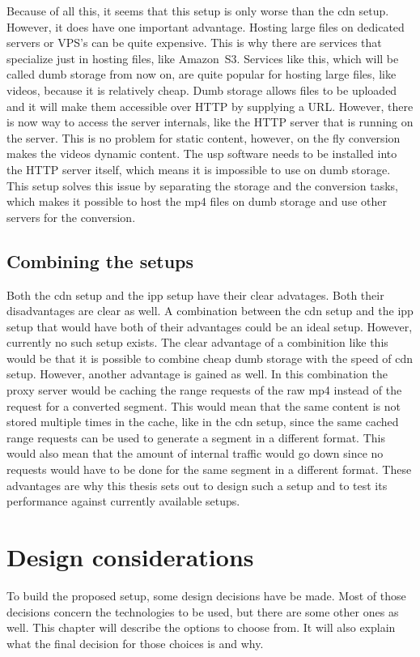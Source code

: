 \documentclass[twoside,openright]{uva-bachelor-thesis}
\begin{document}
Because of all this, it seems that this setup is only worse than the \gls{cdn}
setup. However, it does have one important advantage. Hosting large files on
dedicated servers or VPS’s can be quite expensive. This is why there are
services that specialize just in hosting files, like Amazon~S3. Services like
this, which will be called dumb storage from now on, are quite popular for
hosting large files, like videos, because it is relatively cheap. Dumb storage
allows files to be uploaded and it will make them accessible over HTTP by
supplying a URL\@.  However, there is now way to access the server internals,
like the HTTP server that is running on the server. This is no problem for
static content, however, on the fly conversion makes the videos dynamic content.
The \gls{usp} software needs to be installed into the HTTP server itself, which
means it is impossible to use on dumb storage. This setup solves this issue by
separating the storage and the conversion tasks, which makes it possible to host
the mp4 files on dumb storage and use other servers for the conversion.

\section{Combining the setups}
Both the \gls{cdn} setup and the \gls{ipp} setup have their clear advatages.
Both their disadvantages are clear as well. A combination between the \gls{cdn}
setup and the \gls{ipp} setup that would have both of their advantages could be
an ideal setup. However, currently no such setup exists. The clear advantage
of a combinition like this would be that it is possible to combine cheap dumb
storage with the speed of \gls{cdn} setup. However, another advantage is gained
as well. In this combination the proxy server would be caching the range
requests of the raw mp4 instead of the request for a converted segment. This
would mean that the same content is not stored multiple times in the cache, like
in the \gls{cdn} setup, since the same cached range requests can be used to
generate a segment in a different format. This would also mean that the amount
of internal traffic would go down since no requests would have to be done for
the same segment in a different format. These advantages are why this thesis
sets out to design such a setup and to test its performance against currently
available setups.







\chapter{Design considerations}\label{ch:design}
To build the proposed setup, some design decisions have be made. Most of those
decisions concern the technologies to be used, but there are some other ones as
well. This chapter will describe the options to choose from. It will also
explain what the final decision for those choices is and why.
\end{document}
